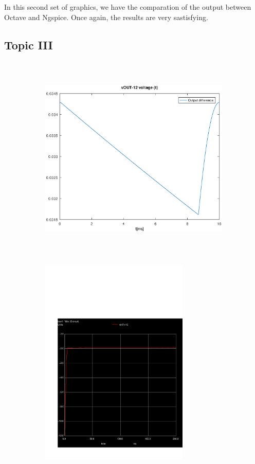 In this second set of graphics, we have the comparation of the output between Octave and Ngspice. Once again, the results are very sastisfying.

\subsection{Topic III}
\label{subsec:third_topic_error}


\begin{figure}[H]

\begin{subfigure}{0.5\textwidth}
\includegraphics[width=0.9\linewidth, height=10cm]{outputdiff.eps} 
\label{fig:theothirdcompare}
\end{subfigure}
\begin{subfigure}{0.5\textwidth}
\includegraphics[width=0.9\linewidth, height=10cm]{trans3.pdf}
\label{fig:simthirdcompare}
\end{subfigure}

\label{fig:compar3}
\end{figure}

